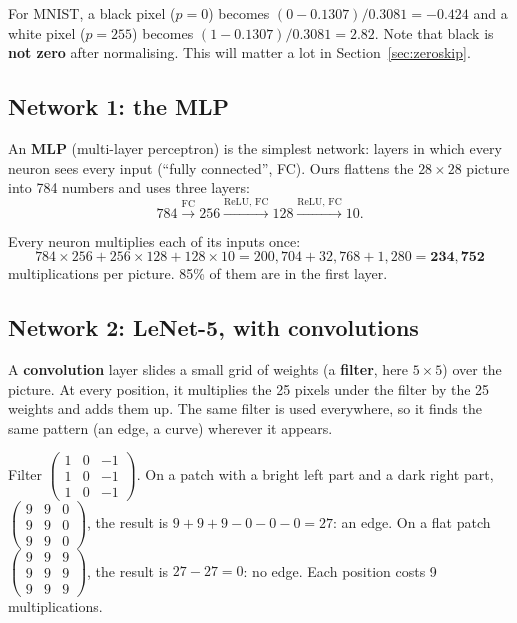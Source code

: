 \begin{example}
For MNIST, a black pixel ($p=0$) becomes $(0-0.1307)/0.3081 = -0.424$ and a white pixel ($p=255$)
becomes $(1-0.1307)/0.3081 = 2.82$. Note that black is \textbf{not zero} after normalising. This will
matter a lot in Section~\ref{sec:zeroskip}.
\end{example}

\subsection{Network 1: the MLP}

An \textbf{MLP} (multi-layer perceptron) is the simplest network: layers in which every neuron sees
every input (``fully connected'', FC). Ours flattens the $28\times28$ picture into 784 numbers and uses
three layers:
\[
  784 \xrightarrow{\text{FC}} 256 \xrightarrow{\text{ReLU, FC}} 128 \xrightarrow{\text{ReLU, FC}} 10.
\]

\begin{example}
Every neuron multiplies each of its inputs once:
\[
  784\times256 + 256\times128 + 128\times10 = 200{,}704 + 32{,}768 + 1{,}280 = \mathbf{234{,}752}
\]
multiplications per picture. 85\% of them are in the first layer.
\end{example}

\subsection{Network 2: LeNet-5, with convolutions}

A \textbf{convolution} layer slides a small grid of weights (a \textbf{filter}, here $5\times5$) over
the picture. At every position, it multiplies the 25 pixels under the filter by the 25 weights and adds
them up. The same filter is used everywhere, so it finds the same pattern (an edge, a curve) wherever it
appears.

\begin{example}
Filter $\begin{pmatrix}1&0&-1\\1&0&-1\\1&0&-1\end{pmatrix}$.
On a patch with a bright left part and a dark right part,
$\begin{pmatrix}9&9&0\\9&9&0\\9&9&0\end{pmatrix}$, the result is $9+9+9-0-0-0 = 27$: an edge.
On a flat patch $\begin{pmatrix}9&9&9\\9&9&9\\9&9&9\end{pmatrix}$, the result is
$27-27 = 0$: no edge. Each position costs 9 multiplications.
\end{example}

